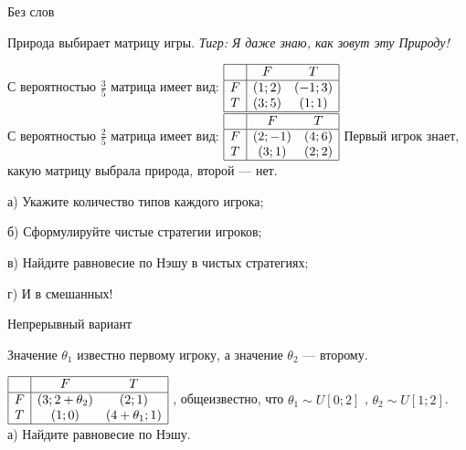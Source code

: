 \begin{problem}
 Без слов\par
Природа выбирает матрицу игры. {\it Тигр: Я даже знаю, как зовут эту Природу!}\par
С вероятностью  $\frac{3}{5} $  матрица имеет вид:  $\begin{array}{|c|cc|}  \hline {} & {F} & {T} \\  \hline {F} & {\left(1;2\right)} & {\left(-1;3\right)} \\ {T} & {\left(3;5\right)} & {\left(1;1\right)} \\  \hline  \end{array}$ \\
С вероятностью  $\frac{2}{5} $  матрица имеет вид:  $\begin{array}{|c|cc|}  \hline {} & {F} & {T} \\  \hline {F} & {\left(2;-1\right)} & {\left(4;6\right)} \\ {T} & {\left(3;1\right)} & {\left(2;2\right)} \\  \hline  \end{array}$
Первый игрок знает, какую матрицу выбрала природа, второй — нет.\par
а)	Укажите количество типов каждого игрока;\par
б)	Сформулируйте чистые стратегии игроков;\par
в)	Найдите равновесие по Нэшу в чистых стратегиях;\par
г)	И в смешанных!\par



\begin{sol}

\end{sol}
\end{problem}



\begin{problem}
 Непрерывный вариант\par
Значение  $\theta _{1} $  известно первому игроку, а значение  $\theta _{2} $  — второму.

 $\begin{array}{|c|cc|}  \hline {} & {F} & {T} \\  \hline {F} & {\left(3;2+\theta _{2} \right)} & {\left(2;1\right)} \\ {T} & {\left(1;0\right)} & {\left(4+\theta _{1} ;1\right)} \\  \hline  \end{array}$ , общеизвестно, что  $\theta _{1} \sim U\left[0;2\right]$ ,  $\theta _{2} \sim U\left[1;2\right]$.\\
а)	Найдите равновесие по Нэшу.



\begin{sol}

\end{sol}
\end{problem}



